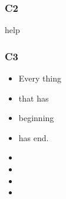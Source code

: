 \documentclass[10pt,slidestop,mathserif]{beamer}
\begin{document}
\begin{frame}
	\frametitle{C2}
	\hyperlink{th1}{}
	\hypertarget{th1}{help}
\end{frame}

\begin{frame}
	\frametitle{C3}
	\begin{itemize}
		\item <+-| alert@+> Every thing
		\item <+-| alert@+> that has
		\item <+-| alert@+> beginning
		\item <+-| alert@+> has end.
	\end{itemize}

	\begin{itemize}
		\item<2-> 
		\item<2-> 
		\item<2-> 
		\item<2-> 
	\end{itemize}
				
			
		
	

\end{frame}

%
\end{document}
